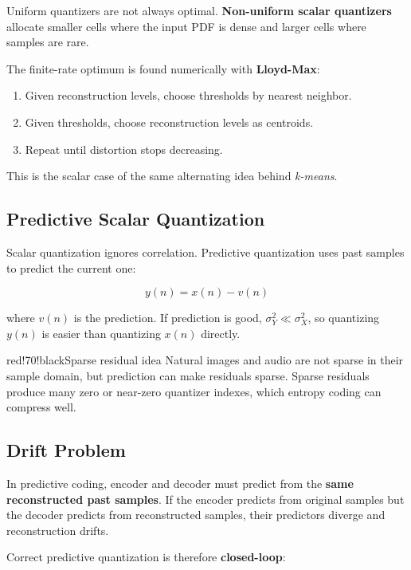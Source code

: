 Uniform quantizers are not always optimal. \textbf{Non-uniform scalar quantizers} allocate smaller cells where the input PDF is dense and larger cells where samples are rare.

The finite-rate optimum is found numerically with \textbf{Lloyd-Max}:

\begin{enumerate}
  \item Given reconstruction levels, choose thresholds by nearest neighbor.
  \item Given thresholds, choose reconstruction levels as centroids.
  \item Repeat until distortion stops decreasing.
\end{enumerate}

This is the scalar case of the same alternating idea behind \textit{k-means}.

\subsection{Predictive Scalar Quantization}

Scalar quantization ignores correlation. Predictive quantization uses past samples to predict the current one:

\[
y(n)=x(n)-v(n)
\]

where $v(n)$ is the prediction. If prediction is good, $\sigma_Y^2\ll\sigma_X^2$, so quantizing $y(n)$ is easier than quantizing $x(n)$ directly.

\begin{calloutbox}{red!70!black}{Sparse residual idea}
Natural images and audio are not sparse in their sample domain, but prediction can make residuals sparse. Sparse residuals produce many zero or near-zero quantizer indexes, which entropy coding can compress well.
\end{calloutbox}

\subsection{Drift Problem}

In predictive coding, encoder and decoder must predict from the \textbf{same reconstructed past samples}. If the encoder predicts from original samples but the decoder predicts from reconstructed samples, their predictors diverge and reconstruction drifts.

Correct predictive quantization is therefore \textbf{closed-loop}:

